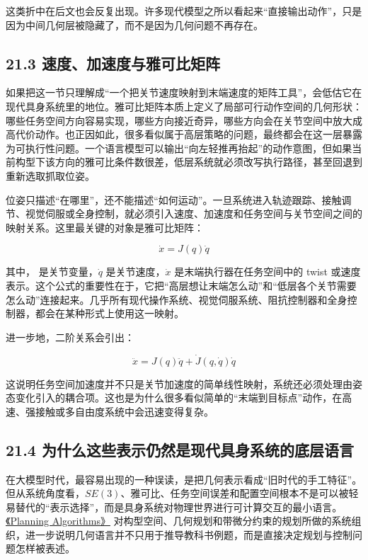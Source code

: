 这类折中在后文也会反复出现。许多现代模型之所以看起来“直接输出动作”，只是因为中间几何层被隐藏了，而不是因为几何问题不再存在。

\subsection*{21.3 速度、加速度与雅可比矩阵}


如果把这一节只理解成“一个把关节速度映射到末端速度的矩阵工具”，会低估它在现代具身系统里的地位。雅可比矩阵本质上定义了局部可行动作空间的几何形状：哪些任务空间方向容易实现，哪些方向接近奇异，哪些方向会在关节空间中放大成高代价动作。也正因如此，很多看似属于高层策略的问题，最终都会在这一层暴露为可执行性问题。一个语言模型可以输出“向左轻推再抬起”的动作意图，但如果当前构型下该方向的雅可比条件数很差，低层系统就必须改写执行路径，甚至回退到重新选取抓取位姿。

位姿只描述“在哪里”，还不能描述“如何运动”。一旦系统进入轨迹跟踪、接触调节、视觉伺服或全身控制，就必须引入速度、加速度和任务空间与关节空间之间的映射关系。这里最关键的对象是雅可比矩阵：

\begin{equation*}
\dot{x} = J(q)\dot{q}
\end{equation*}

其中，\texttt{} 是关节变量，\(\dot{q}\) 是关节速度，\(\dot{x}\) 是末端执行器在任务空间中的 twist 或速度表示。这个公式的重要性在于，它把“高层想让末端怎么动”和“低层各个关节需要怎么动”连接起来。几乎所有现代操作系统、视觉伺服系统、阻抗控制器和全身控制器，都会在某种形式上使用这一映射。

进一步地，二阶关系会引出：

\begin{equation*}
\ddot{x} = J(q)\ddot{q} + \dot{J}(q,\dot{q})\dot{q}
\end{equation*}

这说明任务空间加速度并不只是关节加速度的简单线性映射，系统还必须处理由姿态变化引入的耦合项。这也是为什么很多看似简单的“末端到目标点”动作，在高速、强接触或多自由度系统中会迅速变得复杂。

\subsection*{21.4 为什么这些表示仍然是现代具身系统的底层语言}


在大模型时代，最容易出现的一种误读，是把几何表示看成“旧时代的手工特征”。但从系统角度看，\(SE(3)\)、雅可比、任务空间误差和配置空间根本不是可以被轻易替代的“表示选择”，而是具身系统对物理世界进行可计算交互的最小语言。\href{https://lavalle.pl/planning/}{《Planning Algorithms》} 对构型空间、几何规划和带微分约束的规划所做的系统组织，进一步说明几何语言并不只用于推导教科书例题，而是直接决定规划与控制问题怎样被表述。

